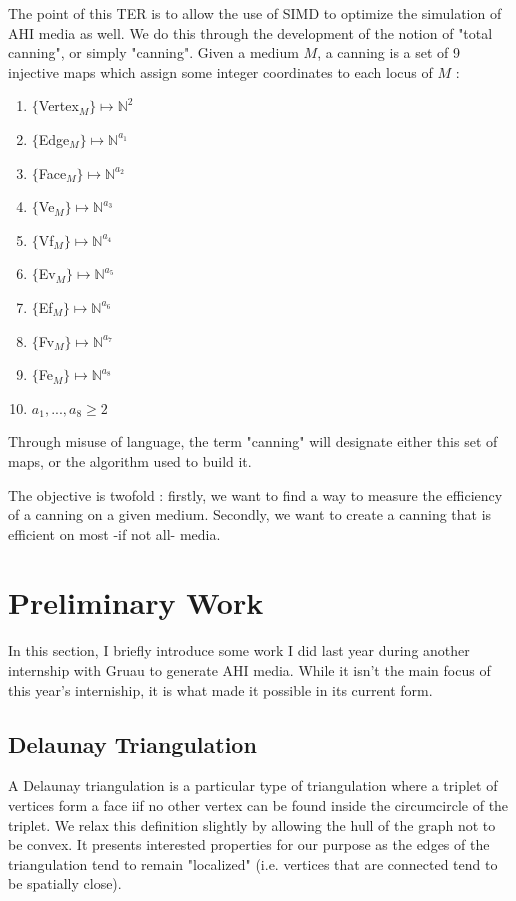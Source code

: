 \documentclass{article}
\begin{document}
The point of this TER is to allow the use of SIMD to optimize the simulation of AHI media as well. We do this through the development of the notion of "total canning", or simply "canning". Given a medium $M$, a canning is a set of 9 injective maps which assign some integer coordinates to each locus of $M$ :
\begin{enumerate}
	\item $\{$Vertex$_M\} \mapsto \mathbb{N}^2$
	\item $\{$Edge$_M\} \mapsto \mathbb{N}^{a_1}$
	\item $\{$Face$_M\} \mapsto \mathbb{N}^{a_2}$
	\item $\{$Ve$_M\} \mapsto \mathbb{N}^{a_3}$
	\item $\{$Vf$_M\} \mapsto \mathbb{N}^{a_4}$
	\item $\{$Ev$_M\} \mapsto \mathbb{N}^{a_5}$
	\item $\{$Ef$_M\} \mapsto \mathbb{N}^{a_6}$
	\item $\{$Fv$_M\} \mapsto \mathbb{N}^{a_7}$
	\item $\{$Fe$_M\} \mapsto \mathbb{N}^{a_8}$
	\item[] $a_1, ..., a_8 \geq 2$
\end{enumerate}
Through misuse of language, the term "canning" will designate either this set of maps, or the algorithm used to build it.

The objective is twofold : firstly, we want to find a way to measure the efficiency of a canning on a given medium. Secondly, we want to create a canning that is efficient on most -if not all- media.

\section{Preliminary Work}

In this section, I briefly introduce some work I did last year during another internship with Gruau to generate AHI media. While it isn't the main focus of this year's interniship, it is what made it possible in its current form.

\subsection{Delaunay Triangulation}

A Delaunay triangulation is a particular type of triangulation where a triplet of vertices form a face iif no other vertex can be found inside the circumcircle of the triplet. We relax this definition slightly by allowing the hull of the graph not to be convex. It presents interested properties for our purpose as the edges of the triangulation tend to remain "localized" (i.e. vertices that are connected tend to be spatially close).
\end{document}
